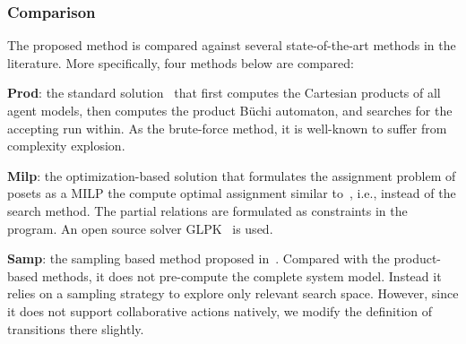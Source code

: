 \subsubsection{Comparison}\label{subsubsec:compare}
The proposed method is compared against several
state-of-the-art methods in the literature.
More specifically, four methods below are compared:

\textbf{Prod}: the standard solution~\citep{baier2008principles}
that first computes
the Cartesian products of all agent models,
then computes the product B\"uchi automaton,
and searches for the accepting run within.
As the brute-force method,
it is well-known to suffer from complexity explosion.

\textbf{Milp}: the optimization-based solution that
formulates the assignment problem of posets as a MILP
the compute optimal assignment similar
to~\citep{luo2021temporal, jones2019scratchs},
i.e., instead of the search method.
The partial relations are formulated as constraints
in the program.
An open source solver GLPK~\citep{makhorin2008glpk} is used.

\textbf{Samp}: the sampling based method proposed
in~\citep{kantaros2020stylus}.
Compared with the product-based methods, it does not pre-compute
the complete system model. Instead it relies on a sampling strategy
to explore only relevant search space.
However, since it does not support collaborative actions natively,
we modify the definition of transitions there slightly.

